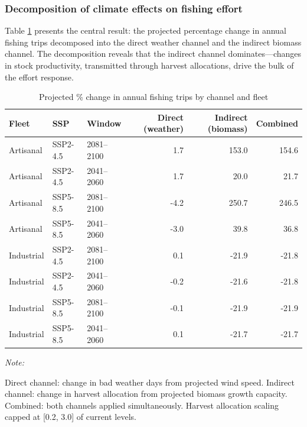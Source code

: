 \documentclass[
  11pt,
]{article}
\begin{document}
\subsubsection{Decomposition of climate effects on fishing effort}\label{decomposition-of-climate-effects-on-fishing-effort}

Table \ref{tab:decomposition} presents the central result: the projected percentage change in annual fishing trips decomposed into the direct weather channel and the indirect biomass channel. The decomposition reveals that the indirect channel dominates---changes in stock productivity, transmitted through harvest allocations, drive the bulk of the effort response.

\begin{table}[!h]
\centering
\caption{\label{tab:decomposition}Projected \% change in annual fishing trips by channel and fleet}
\centering
\fontsize{10}{12}\selectfont
\begin{threeparttable}
\begin{tabular}[t]{lllrrr}
\toprule
Fleet & SSP & Window & Direct (weather) & Indirect (biomass) & Combined\\
\midrule
Artisanal & SSP2-4.5 & 2081--2100 & 1.7 & 153.0 & 154.6\\
Artisanal & SSP2-4.5 & 2041--2060 & 1.7 & 20.0 & 21.7\\
Artisanal & SSP5-8.5 & 2081--2100 & -4.2 & 250.7 & 246.5\\
Artisanal & SSP5-8.5 & 2041--2060 & -3.0 & 39.8 & 36.8\\
Industrial & SSP2-4.5 & 2081--2100 & 0.1 & -21.9 & -21.8\\
\addlinespace
Industrial & SSP2-4.5 & 2041--2060 & -0.2 & -21.6 & -21.8\\
Industrial & SSP5-8.5 & 2081--2100 & -0.1 & -21.9 & -21.9\\
Industrial & SSP5-8.5 & 2041--2060 & 0.1 & -21.7 & -21.7\\
\bottomrule
\end{tabular}
\begin{tablenotes}
\item \textit{Note:} 
\item Direct channel: change in bad weather days from projected wind speed. Indirect channel: change in harvest allocation from projected biomass growth capacity. Combined: both channels applied simultaneously. Harvest allocation scaling capped at [0.2, 3.0] of current levels.
\end{tablenotes}
\end{threeparttable}
\end{table}
\end{document}
